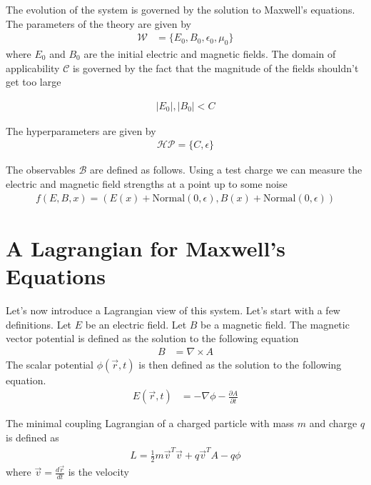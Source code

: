 \documentclass[book.tex]{subfiles}
\begin{document}
The evolution of the system is governed by the solution to Maxwell's equations. The parameters of the theory are given by
\begin{align}
\mathcal{W} &= \{E_0, B_0, \epsilon_0, \mu_0\}
\end{align}
where $E_0$ and $B_0$ are the initial electric and magnetic fields. The domain of applicability $\mathcal{C}$ is governed by the fact that the magnitude of the fields shouldn't get too large 

\begin{align}
|E_0|, |B_0| < C
\end{align}

The hyperparameters are given by \begin{align}
\mathcal{HP} = \{C, \epsilon \}
\end{align}

The observables $\mathcal{B}$ are defined as follows. Using a test charge we can measure the electric and magnetic field strengths at a point up to some noise 
\begin{align}
f(E, B, x) = (E(x) + \textrm{Normal}(0, \epsilon), B(x) + \textrm{Normal}(0, \epsilon))
\end{align}

\section{A Lagrangian for Maxwell's Equations}
Let's now introduce a Lagrangian view of this system. Let's start with a few definitions. Let $E$ be an electric field. Let $B$ be a magnetic field. The magnetic vector potential is defined as the solution to the following equation
\begin{align}
    B &= \nabla \times A
\end{align}
The scalar potential $\phi(\vec{r}, t)$ is then defined as the solution to the following equation.
\begin{align}
    E(\vec{r}, t)  &= - \nabla \phi - \frac{\partial A}{\partial t}
\end{align}

The minimal coupling Lagrangian of a charged particle with mass $m$ and charge $q$ is defined as
\begin{align}
    L = \frac{1}{2} m \vec{v}^T\vec{v} + q \vec{v}^TA - q \phi 
\end{align}
where $\vec{v} = \frac{d \vec{r}}{dt}$ is the velocity 

\end{document}
